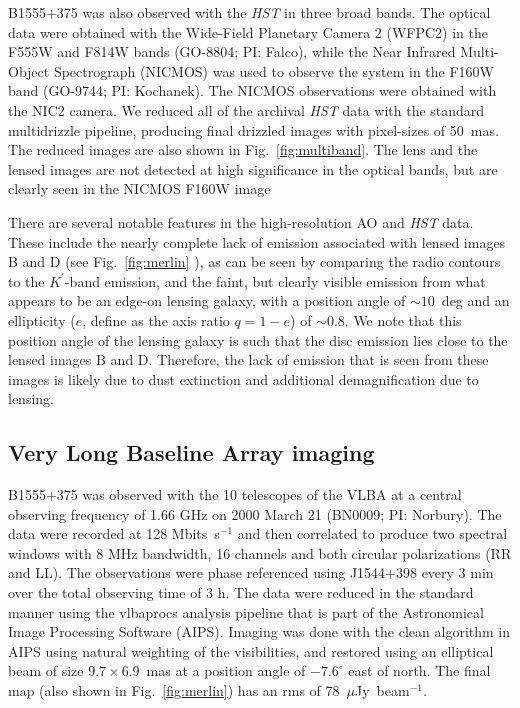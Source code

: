 \documentclass[a4paper,fleqn,usenatbib,useAMS]{mnras}
\begin{document}
B1555+375 was also observed with the {\it HST} in three broad bands.  The optical data were obtained with the Wide-Field Planetary Camera 2 (WFPC2) in the F555W and F814W bands (GO-8804; PI: Falco), while the Near Infrared Multi-Object Spectrograph (NICMOS) was used to observe the system in the F160W band (GO-9744; PI: Kochanek).  The NICMOS observations were obtained with the NIC2 camera.  We reduced all of the archival \textit{HST} data with the standard {\sc multidrizzle} pipeline, producing final drizzled images with pixel-sizes of 50~mas. The reduced images are also shown in Fig.~\ref{fig:multiband}. The lens and the lensed images are not detected at high significance in the optical bands, but are clearly seen in the NICMOS F160W image

There are several notable features in the high-resolution AO and {\it HST} data. These include the nearly complete lack of emission associated with lensed images B and D (see Fig.~\ref{fig:merlin} ), as can be seen by comparing the radio contours to the $K^\prime$-band emission, and the faint, but clearly visible emission from what appears to be an edge-on lensing galaxy, with a position angle of $\sim 10$~deg and an ellipticity ($e$, define as the axis ratio $q=1-e$) of $\sim 0.8$. We note that this position angle of the lensing galaxy is such that the disc emission lies close to the lensed images B and D. Therefore, the lack of emission that is seen from these images is likely due to dust extinction and additional demagnification due to lensing. 

\subsection{Very Long Baseline Array imaging}

B1555+375 was observed with the 10 telescopes of the VLBA at a central observing frequency of 1.66 GHz on 2000 March 21 (BN0009; PI: Norbury). The data were recorded at 128 Mbits~s$^{-1}$ and then correlated to produce two spectral windows with 8 MHz bandwidth, 16 channels and both circular polarizations (RR and LL). The observations were phase referenced using J1544+398 every 3 min over the total observing time of 3 h. The data were reduced in the standard manner using the {\sc vlbaprocs} analysis pipeline that is part of the Astronomical Image Processing Software (AIPS). Imaging was done with the {\sc clean} algorithm in AIPS using natural weighting of the visibilities, and restored using an elliptical beam of size $9.7 \times 6.9$~mas at a position angle of $-7.6^\circ$ east of north. The final map (also shown in Fig.~\ref{fig:merlin}) has an rms of 78~$\mu$Jy~beam$^{-1}$.
\end{document}

